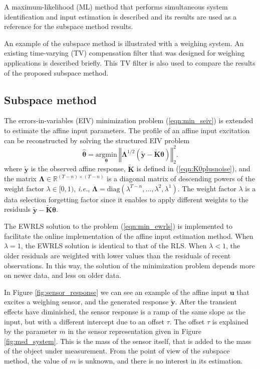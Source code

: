 A maximum-likelihood (ML) method that performs simultaneous system identification and input estimation is described and its results are used as a reference for the subspace method results.

An example of the subspace method is illustrated with a weighing system.
An existing time-varying (TV) compensation filter that was designed for weighing applications is described briefly.
This TV filter is also used to compare the results of the proposed subspace method.


\subsection{Subspace method}
The errors-in-variables (EIV) minimization problem (\ref{eqn:min_seiv}) is extended to estimate the affine input parameters.
The profile of an affine input excitation can be reconstructed by solving the structured EIV problem  
\begin{equation} \widehat{\bm{\theta}} = \underset{\bm{\theta}}{\mathrm{argmin}} \ \left\Vert \bm{\Lambda}^{1/2} \left( \widetilde{\mathbf{y}} - \widetilde{\mathbf{K}} \bm{\theta} \right) \right\Vert^2_2 . \label{eqn:min_ewrls} \end{equation}
where $\widetilde{\mathbf{y}}$ is the observed affine response, $\widetilde{\mathbf{K}}$ is defined in (\ref{eqn:K0plusnoise}), and
the matrix $\bm{\Lambda} \in \mathbb{R}^{(T-n) \times (T-n)}$ is a diagonal matrix of descending powers of the weight factor $\lambda \in [0, 1)$, \textit{i.e.},  $\bm{\Lambda} = \mathrm{diag}\left(\lambda^{T-n}, \ldots, \lambda^2, \lambda^1 \right)$.
The weight factor $\lambda$ is a data selection forgetting factor since it enables to apply different weights to the residuals $\widetilde{\mathbf{y}} - \widetilde{\mathbf{K}} \bm{\theta}$.

The EWRLS solution to the problem (\ref{eqn:min_ewrls}) is implemented to facilitate the online implementation of the affine input estimation method.
When $\lambda=1$, the EWRLS solution is identical to that of the RLS.
When $\lambda<1$, the older residuals are weighted with lower values than the residuals of recent observations.
In this way, the solution of the minimization problem depends more on newer data, and less on older data. 

In Figure \ref{fig:sensor_response} we can see an example of the affine input $\mathbf{u}$ that excites a weighing sensor, and the generated response $\widetilde{\mathbf{y}}$.
After the transient effects have diminished, the sensor response is a ramp of the same slope as the input, but with a different intercept due to an offset $\tau$.
The offset $\tau$ is explained by the parameter $m$ in the sensor representation given in Figure \ref{fig:msd_system}.
This is the mass of the sensor itself, that is added to the mass of the object under measurement.	
From the point of view of the subspace method, the value of $m$ is unknown, and there is no interest in its estimation.

